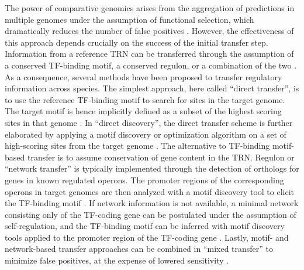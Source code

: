 The power of comparative genomics arises from the aggregation of predictions in
multiple genomes under the assumption of functional selection, which
dramatically reduces the number of false positives
\cite{gelfand2000comparative}. However, the effectiveness of this approach
depends crucially on the success of the initial transfer step. Information from
a reference TRN can be transferred through the assumption of a conserved
TF-binding motif, a conserved regulon, or a combination of the two
\cite{babu2008computational, baumbach2010power}. As a consequence, several
methods have been proposed to transfer regulatory information across
species. The simplest approach, here called “direct transfer”, is to use the
reference TF-binding motif to search for sites in the target genome. The target
motif is hence implicitly defined as a subset of the highest scoring sites in
that genome \cite{tan2001comparative, makarova2001conservation,
  erill2004differences, rodionov2013transcriptional}. In “direct discovery”,
the direct transfer scheme is further elaborated by applying a motif discovery
or optimization algorithm on a set of high-scoring sites from the target genome
\cite{baumbach2009reliable, habib2012functional}. The alternative to TF-binding
motif-based transfer is to assume conservation of gene content in the
TRN. Regulon or “network transfer” is typically implemented through the
detection of orthologs for genes in known regulated operons. The promoter
regions of the corresponding operons in target genomes are then analyzed with a
motif discovery tool to elicit the TF-binding motif
\cite{mccue2001phylogenetic, wang2003combining, panina2003comparative,
  zhang2009genome}. If network information is not available, a minimal network
consisting only of the TF-coding gene can be postulated under the assumption of
self-regulation, and the TF-binding motif can be inferred with motif discovery
tools applied to the promoter region of the TF-coding gene
\cite{francke2008generic, cornish2012inference,
  ravcheev2014comparative}. Lastly, motif- and network-based transfer
approaches can be combined in “mixed transfer” to minimize false positives, at
the expense of lowered sensitivity \cite{baumbach2010power,
  baumbach2009reliable, yu2004annotation}.

